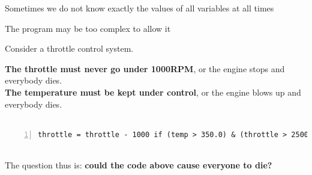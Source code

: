 \documentclass{beamer}
\newcommand{\red}[1]{
\textcolor{red}{#1}
}
\begin{document}
\begin{slide}{
\item Sometimes we do not know exactly the values of all variables at all times
\item The program may be too complex to allow it
}\end{slide}

\begin{frame}[fragile]
Consider a throttle control system. 

\textbf{The throttle must never go under 1000RPM}, or the engine stops and everybody dies. \\

\textbf{The temperature must be kept under control}, or the engine blows up and everybody dies. \\

\ \\
\begin{lstlisting}[frame=shadowbox,numbers=left]
throttle = throttle - 1000 if (temp > 350.0) & (throttle > 2500) else throttle
\end{lstlisting}

\ \\

The question thus is: \textbf{could the code above cause everyone to die?}

\end{frame}

\end{document}
